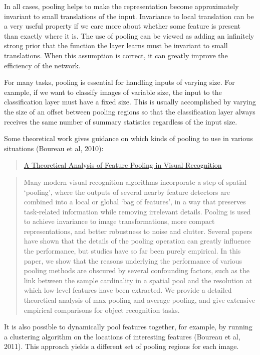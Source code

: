 \documentclass[onecolumn, letterpaper, 12pt]{report}
\begin{document}
In all cases, pooling helps to make the representation become approximately invariant to small translations of the input. Invariance to local translation can be a very useful property if we care more about whether some feature is present than exactly where it is. The use of pooling can be viewed as adding an infinitely strong prior that the function the layer learns must be invariant to small translations. When this assumption is correct, it can greatly improve the efficiency of the network. 

For many tasks, pooling is essential for handling inputs of varying size. For example, if we want to classify images of variable size, the input to the classification layer must have a fixed size. This is usually accomplished by varying the size of an offset between pooling regions so that the classification layer always receives the same number of summary statistics regardless of the input size. 

Some theoretical work gives guidance on which kinds of pooling to use in various situations (Boureau et al, 2010):

\begin{quote}
\href{https://www.di.ens.fr/willow/pdfs/icml2010b.pdf}{A Theoretical Analysis of Feature Pooling in Visual Recognition}  
\end{quote}

\begin{quote}
  Many modern visual recognition algorithms incorporate a step of
  spatial ‘pooling’, where the outputs of several nearby feature
  detectors are combined into a local or global ‘bag of features’, in
  a way that preserves task-related information while removing
  irrelevant details. Pooling is used to achieve invariance to image
  transformations, more compact representations, and better robustness
  to noise and clutter. Several papers have shown that the details of
  the pooling operation can greatly influence the performance, but
  studies have so far been purely empirical. In this paper, we show
  that the reasons underlying the performance of various pooling
  methods are obscured by several confounding factors, such as the
  link between the sample cardinality in a spatial pool and the
  resolution at which low-level features have been extracted. We
  provide a detailed theoretical analysis of max pooling and average
  pooling, and give extensive empirical comparisons for object
  recognition tasks.
\end{quote}

It is also possible to dynamically pool features together, for example, by running a clustering algorithm on the locations of interesting features (Boureau et al, 2011). This approach yields a different set of pooling regions for each image. 
\end{document}
